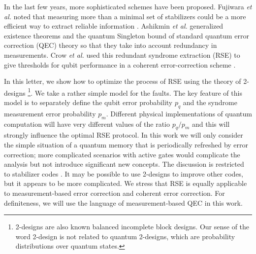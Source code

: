 \documentclass[reprint, superscriptaddress]{revtex4-1}
\numberwithin{equation}{section}
\numberwithin{figure}{section}
\numberwithin{table}{section}
\begin{document}
In the last few years, more sophisticated schemes have been proposed.  Fujiwara \textit{et al.} noted that measuring more than a minimal set of stabilizers could be a more efficient way to extract reliable information \cite{Fujiwara2014, Fujiwara2015}.  Ashikmin \textit{et al.}   generalized existence theorems and the quantum Singleton bound of standard quantum error correction (QEC) theory so that they take into account redundancy in measurements\cite{Ashikhmin2014}.  Crow \textit{et al.}  used this redundant syndrome extraction (RSE) to give thresholds for qubit performance in a coherent error-correction scheme \cite{Crow2016}.  

In this letter, we show how to optimize the process of RSE using the theory of 2-designs \footnote{  2-designs are also known balanced incomplete block designs.  Our sense of the word 2-design is not related to quantum 2-designs, which are probability distributions over quantum states.}.  We take a rather simple model for the faults.  The key feature of this model is to separately define the qubit error probability $p_q$ and the syndrome measurement error probability $p_m$.  Different physical implementations of quantum computation will have very different values of the ratio $p_q/p_m$ and this will strongly influence the optimal RSE protocol.  In this work we will only consider the simple situation of a quantum memory that is periodically refreshed by error correction; more complicated scenarios with active gates would complicate the analysis but not introduce significant new concepts.  The discussion is restricted to stabilizer codes \cite{Gottesman1996}.  It may be possible to use 2-designs to improve other codes, but it appears to be more complicated.  We stress that RSE is equally applicable to measurement-based error correction and coherent error correction.  For definiteness, we will use the language of measurement-based QEC in this work. 
\end{document}
